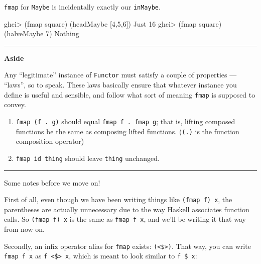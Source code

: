 \documentclass[]{article}
\newenvironment{Shaded}{}{}
\newcommand{\DataTypeTok}[1]{\textcolor[rgb]{0.56,0.13,0.00}{#1}}
\newcommand{\DecValTok}[1]{\textcolor[rgb]{0.25,0.63,0.44}{#1}}
\newcommand{\FunctionTok}[1]{\textcolor[rgb]{0.02,0.16,0.49}{#1}}
\newcommand{\NormalTok}[1]{#1}
\newcommand{\OperatorTok}[1]{\textcolor[rgb]{0.40,0.40,0.40}{#1}}
\begin{document}
\texttt{fmap} for \texttt{Maybe} is incidentally exactly our \texttt{inMaybe}.

\begin{Shaded}
\begin{Highlighting}[]
\NormalTok{ghci}\OperatorTok{\textgreater{}}\NormalTok{ (}\FunctionTok{fmap}\NormalTok{ square) (headMaybe [}\DecValTok{4}\NormalTok{,}\DecValTok{5}\NormalTok{,}\DecValTok{6}\NormalTok{])}
\DataTypeTok{Just} \DecValTok{16}
\NormalTok{ghci}\OperatorTok{\textgreater{}}\NormalTok{ (}\FunctionTok{fmap}\NormalTok{ square) (halveMaybe }\DecValTok{7}\NormalTok{)}
\DataTypeTok{Nothing}
\end{Highlighting}
\end{Shaded}

\begin{center}\rule{0.5\linewidth}{0.5pt}\end{center}

\textbf{Aside}

Any ``legitimate'' instance of \texttt{Functor} must satisfy a couple of
properties --- ``laws'', so to speak. These laws basically ensure that whatever
instance you define is useful and sensible, and follow what sort of meaning
\texttt{fmap} is supposed to convey.

\begin{enumerate}
\def\labelenumi{\arabic{enumi}.}
\tightlist
\item
  \texttt{fmap\ (f\ .\ g)} should equal \texttt{fmap\ f\ .\ fmap\ g}; that is,
  lifting composed functions be the same as composing lifted functions.
  (\texttt{(.)} is the function composition operator)
\item
  \texttt{fmap\ id\ thing} should leave \texttt{thing} unchanged.
\end{enumerate}

\begin{center}\rule{0.5\linewidth}{0.5pt}\end{center}

Some notes before we move on!

First of all, even though we have been writing things like
\texttt{(fmap\ f)\ x}, the parentheses are actually unnecessary due to the way
Haskell associates function calls. So \texttt{(fmap\ f)\ x} is the same as
\texttt{fmap\ f\ x}, and we'll be writing it that way from now on.

Secondly, an infix operator alias for \texttt{fmap} exists:
\texttt{(\textless{}\$\textgreater{})}. That way, you can write
\texttt{fmap\ f\ x} as \texttt{f\ \textless{}\$\textgreater{}\ x}, which is
meant to look similar to \texttt{f\ \$\ x}:
\end{document}
